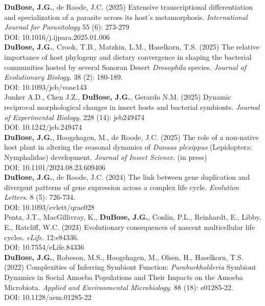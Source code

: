 \documentclass{article}
\begin{document}
\hangindent=0.7cm \textbf{DuBose, J.G.}, de Roode, J.C. (2025) Extensive transcriptional differentiation and specialization of a parasite across its host's metamorphosis. \emph{International Journal for Parasitology} 55 (6): 273-279 \\
DOI: 10.1016/j.ijpara.2025.01.006 \\

\hangindent=0.7cm \textbf{DuBose, J.G.}, Crook, T.B., Matzkin, L.M., Haselkorn, T.S. (2025) The relative importance of host phylogeny and dietary convergence in shaping the bacterial communities hosted by several Sonoran Desert \emph{Drosophila} species. \emph{Journal of Evolutionary Biology}. 38 (2): 180-189.\\ 
DOI: 10.1093/jeb/voae143 \\

\hangindent=0.7cm Junker A.D., Chen J.Z., \textbf{DuBose, J.G.}, Gerardo N.M. (2025) Dynamic reciprocal morphological changes in insect hosts and bacterial symbionts. \emph{Journal of Experimental Biology}. 228 (14): jeb249474 \\
DOI: 10.1242/jeb.249474 \\

\hangindent=0.7cm \textbf{DuBose, J.G.}, Hoogshagen, M., de Roode, J.C. (2025) The role of a non-native host plant in altering the seasonal dynamics of \emph{Danaus plexippus} (Lepidoptera: Nymphalidae) development. \emph{Journal of Insect Science}. (in press) \\
DOI: 10.1101/2024.08.23.609406 \\

\hangindent=0.7cm \textbf{DuBose, J.G.}, de Roode, J.C. (2024) The link between gene duplication and divergent patterns of gene expression across a complex life cycle. \emph{Evolution Letters}. 8 (5): 726-734. \\
DOI: 10.1093/evlett/qrae028 \\

\hangindent=0.7cm Pentz, J.T., MacGillivray, K., \textbf{DuBose, J.G.}, Conlin, P.L., Reinhardt, E., Libby, E., Ratcliff, W.C. (2023) Evolutionary consequences of nascent multicellular life cycles. \emph{eLife}. 12:e84336. \\
DOI: 10.7554/eLife.84336 \\

\hangindent=0.7cm \textbf{DuBose, J.G.}, Robeson, M.S., Hoogshagen, M., Olsen, H., Haselkorn, T.S. (2022) Complexities of Inferring Symbiont Function: \emph{Paraburkholderia} Symbiont Dynamics in Social Amoeba Populations and Their Impacts on the Amoeba Microbiota. \emph{Applied and Environmental Microbiology}. 88 (18): e01285-22.\\
DOI: 10.1128/aem.01285-22 \\
\end{document}
